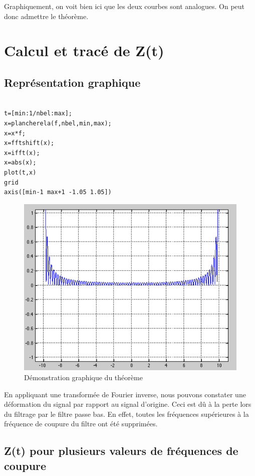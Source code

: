 \documentclass[a4paper, oneside]{report}
\begin{document}
Graphiquement, on voit bien ici que les deux courbes sont analogues.
On peut donc admettre le th\'eor\`eme.

\chapter{Calcul et trac\'e de Z(t)}
 
 	\section{Repr\'esentation graphique}
	
\begin{lstlisting}

t=[min:1/nbel:max];
x=plancherela(f,nbel,min,max);
x=x*f;
x=fftshift(x);
x=ifft(x);
x=abs(x);
plot(t,x)
grid
axis([min-1 max+1 -1.05 1.05])
\end{lstlisting}

	 \begin{figure}[h]
	\centering
	\includegraphics[scale=0.75]{images/zt5.png}
	\caption{D\'emonstration graphique du th\'eor\`eme}
	\end{figure}
En appliquant une transform\'ee de Fourier inverse, nous pouvons constater une d\'eformation du signal par rapport au signal d'origine. Ceci est d\^u \`a la perte lors du filtrage par le filtre passe bas. En effet, toutes les fr\'equences sup\'erieures \`a la fr\'equence de coupure du filtre ont \'et\'e supprim\'ees.


	\section{Z(t) pour plusieurs valeurs de fr\'equences de coupure}
\end{document}
